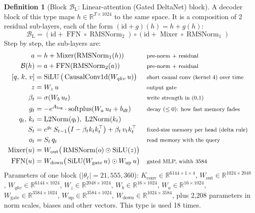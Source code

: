 \documentclass[10pt,a4paper]{article}
\newcommand{\op}[1]{\operatorname{#1}}
\theoremstyle{definition}
\newtheorem{definition}{Definition}[section]
\begin{document}
\begin{definition}[Block $\mathcal{B}_{\mathrm{L}}$: Linear-attention (Gated DeltaNet) block]
A decoder block of this type maps $h\in\mathbb{R}^{T\times 1024}$ to the same space. It is a composition of 2 residual sub-layers, each of the form $(\mathrm{id}+g)(h)=h+g(h)$:
\begin{equation}
  \mathcal{B}_{\mathrm{L}} = (\mathrm{id}+\op{FFN}\circ \op{RMSNorm}_{2})\circ(\mathrm{id}+\op{Mixer}\circ \op{RMSNorm}_{1})
\end{equation}
Step by step, the sub-layers are:
\begin{align*}
  a &= h + \op{Mixer}(\op{RMSNorm}_{1}(h)) && \text{\footnotesize pre-norm + residual} \\
  \mathcal{B}(h) &= a + \op{FFN}(\op{RMSNorm}_{2}(a)) && \text{\footnotesize pre-norm + residual} \\
  [q,\,k,\,v] &= \op{SiLU}\big(\op{CausalConv1d}(W_{qkv}\,u)\big) && \text{\footnotesize short causal conv (kernel 4) over time} \\
  z &= W_{z}\,u && \text{\footnotesize output gate} \\
  \beta_t &= \sigma(W_{b}\,u_t) && \text{\footnotesize write strength in (0,1)} \\
  g_t &= -e^{A_{\log}}\cdot\op{softplus}(W_{a}\,u_t + b_{dt}) && \text{\footnotesize decay ($\le 0$): how fast memory fades} \\
  q_t,\,k_t &= \op{L2Norm}(q_t),\ \op{L2Norm}(k_t) \\
  S_t &= e^{g_t}\,S_{t-1}\big(I - \beta_t k_t k_t^{\top}\big) + \beta_t\, v_t k_t^{\top} && \text{\footnotesize fixed-size memory per head (delta rule)} \\
  o_t &= S_t\, q_t && \text{\footnotesize read memory with the query} \\
  \op{Mixer}(u) &= W_{\mathrm{out}}\big(\op{RMSNorm}(o)\odot\op{SiLU}(z)\big) \\
  \op{FFN}(u) &= W_{\mathrm{down}}\big(\op{SiLU}(W_{\mathrm{gate}}\,u)\odot W_{\mathrm{up}}\,u\big) && \text{\footnotesize gated MLP, width 3584}
\end{align*}
Parameters of one block ($|\theta_\ell|=21{,}555{,}360$): $K_{\mathrm{conv}}\in\mathbb{R}^{6144\times1\times4}$, $W_{\mathrm{out}}\in\mathbb{R}^{1024\times2048}$, $W_{qkv}\in\mathbb{R}^{6144\times1024}$, $W_z\in\mathbb{R}^{2048\times1024}$, $W_b\in\mathbb{R}^{16\times1024}$, $W_a\in\mathbb{R}^{16\times1024}$, $W_{\mathrm{gate}}\in\mathbb{R}^{3584\times1024}$, $W_{\mathrm{up}}\in\mathbb{R}^{3584\times1024}$, $W_{\mathrm{down}}\in\mathbb{R}^{1024\times3584}$, plus 2,208 parameters in norm scales, biases and other vectors. This type is used 18 times.
\end{definition}
\end{document}
